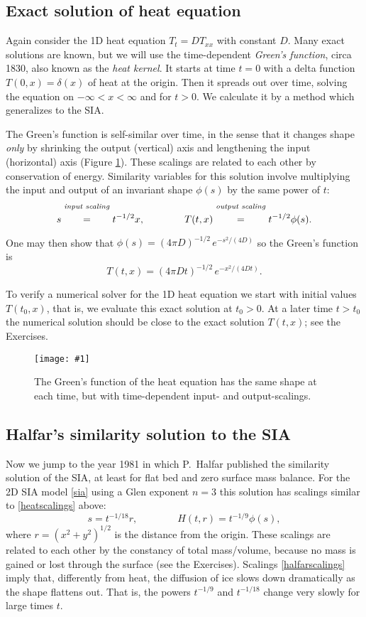 \documentclass[letterpaper,final,12pt,reqno]{amsart}
\newcommand{\onefigsize}[3]{
\begin{figure}[ht]
\centering
\texttt{[image: \#1]}
\caption{#2}
\label{fig:#1}
\end{figure}}
\begin{document}
\subsection*{Exact solution of heat equation}  Again consider the 1D heat equation $T_t = D T_{xx}$ with constant $D$.  Many exact solutions are known, but we will use the time-dependent \emph{Green's function}, circa 1830, also known as the \emph{heat kernel}.  It starts at time $t=0$ with a delta function $T(0,x)=\delta(x)$ of heat at the origin.  Then it spreads out over time, solving the equation on $-\infty<x<\infty$ and for $t>0$.  We calculate it by a method which generalizes to the SIA.

The Green's function is self-similar over time, in the sense that it changes shape \emph{only} by shrinking the output (vertical) axis and lengthening the input (horizontal) axis (Figure \ref{fig:heatscaling}).  These scalings are related to each other by conservation of energy.  Similarity variables for this solution involve multiplying the input and output of an invariant shape $\phi(s)$ by the same power of $t$:
\begin{equation}
s \stackrel{\text{\emph{input scaling}}}{\phantom{\Big|}=\phantom{\Big|}} t^{-1/2} x, \qquad\qquad T(t,x) \stackrel{\text{\emph{output scaling}}}{\phantom{\Big|}=\phantom{\Big|}} t^{-1/2} \phi(s).  \label{heatscalings}
\end{equation}
One may then show that $\phi(s) = (4 \pi D)^{-1/2}\, e^{-s^2/(4D)}$ so the Green's function is
  $$T(t,x) = (4 \pi D t)^{-1/2}\, e^{-x^2/(4Dt)}.$$

To verify a numerical solver for the 1D heat equation we start with initial values $T(t_0,x)$, that is, we evaluate this exact solution at $t_0>0$.  At a later time $t>t_0$ the numerical solution should be close to the exact solution $T(t,x)$; see the Exercises.

\onefigsize{heatscaling}{The Green's function of the heat equation has the same shape at each time, but with time-dependent input- and output-scalings.}{2.4in}

\subsection*{Halfar's similarity solution to the SIA}  Now we jump to the year 1981 in which P.~Halfar \cite{Halfar81,Halfar83} published the similarity solution of the SIA, at least for flat bed and zero surface mass balance.  For the 2D SIA model \eqref{sia} using a Glen exponent $n=3$ this solution has scalings similar to \eqref{heatscalings} above:
\begin{equation}
s = t^{-1/18} r, \qquad \qquad H(t,r)=t^{-1/9} \phi(s), \label{halfarscalings}
\end{equation}
where $r=(x^2+y^2)^{1/2}$ is the distance from the origin.  These scalings are related to each other by the constancy of total mass/volume, because no mass is gained or lost through the surface (see the Exercises). Scalings \eqref{halfarscalings} imply that, differently from heat, the diffusion of ice slows down dramatically as the shape flattens out.  That is, the powers $t^{-1/9}$ and $t^{-1/18}$ change very slowly for large times $t$.
\end{document}
